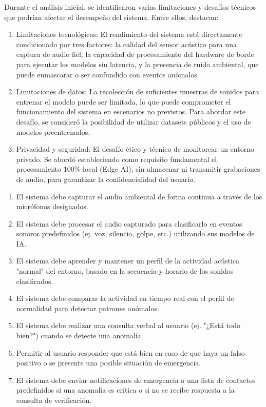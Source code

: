 
Durante el análisis inicial, se identificaron varias limitaciones y desafíos técnicos que podrían afectar el desempeño del sistema. Entre ellos, destacan:

\begin{enumerate}
      \item Limitaciones tecnológicas: El rendimiento del sistema está directamente condicionado por tres factores: la calidad del sensor acústico para una captura de audio fiel, la capacidad de procesamiento del hardware de borde para ejecutar los modelos sin latencia, y la presencia de ruido ambiental, que puede enmascarar o ser confundido con eventos anómalos.
      \item Limitaciones de datos: La recolección de suficientes muestras de sonidos para entrenar el modelo puede ser limitada, lo que puede comprometer el funcionamiento del sistema en escenarios no previstos. Para abordar este desafío, se consideró la posibilidad de utilizar datasets públicos y el uso de modelos preentrenados.
      \item Privacidad y seguridad: El desafío ético y técnico de monitorear un entorno privado. Se abordó estableciendo como requisito fundamental el procesamiento 100\% local (Edge AI), sin almacenar ni transmitir grabaciones de audio, para garantizar la confidencialidad del usuario.
\end{enumerate}


\begin{enumerate}
      \item El sistema debe capturar el audio ambiental de forma continua a través de los micrófonos designados.
      \item El sistema debe procesar el audio capturado para clasificarlo en eventos sonoros predefinidos (ej. voz, silencio, golpe, etc.) utilizando sus modelos de IA.
      \item El sistema debe aprender y mantener un perfil de la actividad acústica "normal" del entorno, basado en la secuencia y horario de los sonidos clasificados.
      \item El sistema debe comparar la actividad en tiempo real con el perfil de normalidad para detectar patrones anómalos.
      \item El sistema debe realizar una consulta verbal al usuario (ej. "¿Está todo bien?") cuando se detecte una anomalía.
      \item Permitir al usuario responder que está bien en caso de que haya un falso positivo o se presente una posible situación de emergencia.
      \item El sistema debe enviar notificaciones de emergencia a una lista de contactos predefinidos si una anomalía es crítica o si no se recibe respuesta a la consulta de verificación.
\end{enumerate}

